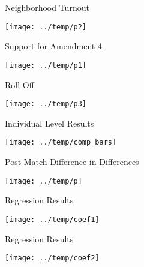 \documentclass[
  ignorenonframetext,
  aspectratio=169]{beamer}
\begin{document}
\begin{frame}{Neighborhood Turnout}
\protect\hypertarget{neighborhood-turnout}{}
\begin{center}\texttt{[image: ../temp/p2]} \end{center}
\end{frame}

\begin{frame}{Support for Amendment 4}
\protect\hypertarget{support-for-amendment-4}{}
\begin{center}\texttt{[image: ../temp/p1]} \end{center}
\end{frame}

\begin{frame}{Roll-Off}
\protect\hypertarget{roll-off}{}
\begin{center}\texttt{[image: ../temp/p3]} \end{center}
\end{frame}

\begin{frame}{Individual Level Results}
\protect\hypertarget{individual-level-results}{}
\begin{center}\texttt{[image: ../temp/comp\_bars]} \end{center}
\end{frame}

\begin{frame}{Post-Match Difference-in-Differences}
\protect\hypertarget{post-match-difference-in-differences}{}
\begin{center}\texttt{[image: ../temp/p]} \end{center}
\end{frame}

\begin{frame}{Regression Results}
\protect\hypertarget{regression-results}{}
\begin{center}\texttt{[image: ../temp/coef1]} \end{center}
\end{frame}

\begin{frame}{Regression Results}
\protect\hypertarget{regression-results-1}{}
\begin{center}\texttt{[image: ../temp/coef2]} \end{center}
\end{frame}
\end{document}
